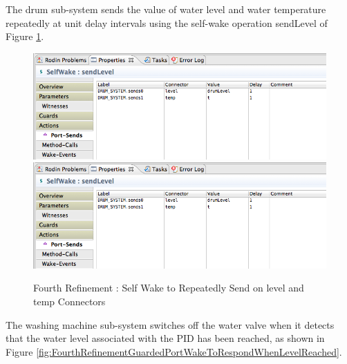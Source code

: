 The drum sub-system sends the value of water level and water temperature repeatedly at unit delay intervals using the self-wake operation sendLevel of Figure \ref{fig:FourthRefinementSelfWakeToRepeatedlySendOnLevelAndTempConnectors}.
 
 \begin{figure}[!htbp]
  \centering
  \ifplastex
  \includegraphics[width=1024]{figures/image46.png}
  \else
  \includegraphics[width=1\textwidth]{figures/image46.png}
  \fi
  \caption{Fourth Refinement : Self Wake to Repeatedly Send on level and temp Connectors}
  \label{fig:FourthRefinementSelfWakeToRepeatedlySendOnLevelAndTempConnectors}
\end{figure} 
 
The washing machine sub-system switches off the water valve when it detects that the water level associated with the PID has been reached, as shown in Figure \ref{fig:FourthRefinementGuardedPortWakeToRespondWhenLevelReached}.
 
